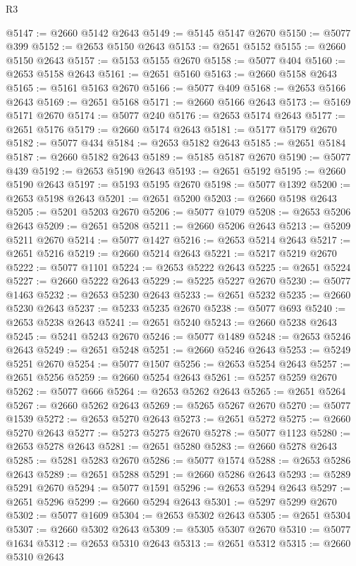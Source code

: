 \begin{lexlean}{R3}
\begin{coremodule}
@5147 := @2660 @5142 @2643
@5149 := @5145 @5147 @2670
@5150 := @5077 @399
@5152 := @2653 @5150 @2643
@5153 := @2651 @5152
@5155 := @2660 @5150 @2643
@5157 := @5153 @5155 @2670
@5158 := @5077 @404
@5160 := @2653 @5158 @2643
@5161 := @2651 @5160
@5163 := @2660 @5158 @2643
@5165 := @5161 @5163 @2670
@5166 := @5077 @409
@5168 := @2653 @5166 @2643
@5169 := @2651 @5168
@5171 := @2660 @5166 @2643
@5173 := @5169 @5171 @2670
@5174 := @5077 @240
@5176 := @2653 @5174 @2643
@5177 := @2651 @5176
@5179 := @2660 @5174 @2643
@5181 := @5177 @5179 @2670
@5182 := @5077 @434
@5184 := @2653 @5182 @2643
@5185 := @2651 @5184
@5187 := @2660 @5182 @2643
@5189 := @5185 @5187 @2670
@5190 := @5077 @439
@5192 := @2653 @5190 @2643
@5193 := @2651 @5192
@5195 := @2660 @5190 @2643
@5197 := @5193 @5195 @2670
@5198 := @5077 @1392
@5200 := @2653 @5198 @2643
@5201 := @2651 @5200
@5203 := @2660 @5198 @2643
@5205 := @5201 @5203 @2670
@5206 := @5077 @1079
@5208 := @2653 @5206 @2643
@5209 := @2651 @5208
@5211 := @2660 @5206 @2643
@5213 := @5209 @5211 @2670
@5214 := @5077 @1427
@5216 := @2653 @5214 @2643
@5217 := @2651 @5216
@5219 := @2660 @5214 @2643
@5221 := @5217 @5219 @2670
@5222 := @5077 @1101
@5224 := @2653 @5222 @2643
@5225 := @2651 @5224
@5227 := @2660 @5222 @2643
@5229 := @5225 @5227 @2670
@5230 := @5077 @1463
@5232 := @2653 @5230 @2643
@5233 := @2651 @5232
@5235 := @2660 @5230 @2643
@5237 := @5233 @5235 @2670
@5238 := @5077 @693
@5240 := @2653 @5238 @2643
@5241 := @2651 @5240
@5243 := @2660 @5238 @2643
@5245 := @5241 @5243 @2670
@5246 := @5077 @1489
@5248 := @2653 @5246 @2643
@5249 := @2651 @5248
@5251 := @2660 @5246 @2643
@5253 := @5249 @5251 @2670
@5254 := @5077 @1507
@5256 := @2653 @5254 @2643
@5257 := @2651 @5256
@5259 := @2660 @5254 @2643
@5261 := @5257 @5259 @2670
@5262 := @5077 @666
@5264 := @2653 @5262 @2643
@5265 := @2651 @5264
@5267 := @2660 @5262 @2643
@5269 := @5265 @5267 @2670
@5270 := @5077 @1539
@5272 := @2653 @5270 @2643
@5273 := @2651 @5272
@5275 := @2660 @5270 @2643
@5277 := @5273 @5275 @2670
@5278 := @5077 @1123
@5280 := @2653 @5278 @2643
@5281 := @2651 @5280
@5283 := @2660 @5278 @2643
@5285 := @5281 @5283 @2670
@5286 := @5077 @1574
@5288 := @2653 @5286 @2643
@5289 := @2651 @5288
@5291 := @2660 @5286 @2643
@5293 := @5289 @5291 @2670
@5294 := @5077 @1591
@5296 := @2653 @5294 @2643
@5297 := @2651 @5296
@5299 := @2660 @5294 @2643
@5301 := @5297 @5299 @2670
@5302 := @5077 @1609
@5304 := @2653 @5302 @2643
@5305 := @2651 @5304
@5307 := @2660 @5302 @2643
@5309 := @5305 @5307 @2670
@5310 := @5077 @1634
@5312 := @2653 @5310 @2643
@5313 := @2651 @5312
@5315 := @2660 @5310 @2643

\end{coremodule}
\end{lexlean}
